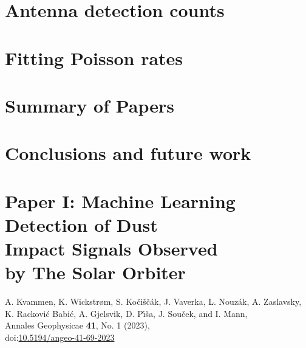 \documentclass[11pt,twoside,openright]{book}
\begin{document}
\chapter{Antenna detection counts}


\chapter{Fitting Poisson rates}


\chapter{Summary of Papers}\label{ch:sum-paper}




\chapter{Conclusions and future work}\label{ch:conclusion}





\backmatter



\chapter{Paper I: Machine Learning \\ Detection of Dust \\ Impact Signals Observed \\ by The Solar Orbiter}
A. Kvammen, K. Wickstr{\o}m, S. Ko{\v{c}}i{\v{s}}{\v{c}}{\'a}k, J. Vaverka, L. Nouz{\'a}k, A. Zaslavsky, K. Rackovi{\'c} Babi{\'c}, A. Gjelsvik, D. P{\'\i}{\v{s}}a, J. Sou{\v{c}}ek, and I. Mann, \\
Annales Geophysicae {\bf 41}, No. 1 (2023),\\
doi:\href{https://doi.org/10.5194/angeo-41-69-2023}{10.5194/angeo-41-69-2023}
\newpage\null\newpage

\end{document}

